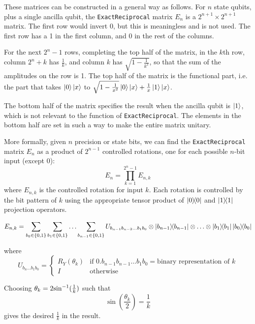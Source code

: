 \documentclass[12pt]{extarticle}
\begin{document}
These matrices can be constructed in a general way as follows.
For $n$ state qubits, plus a single ancilla qubit, the \texttt{ExactReciprocal} matrix $E_n$ is a $2^{n+1} \times 2^{n+1}$ matrix.
The first row would invert 0, but this is meaningless and is not used. The first row has a 1 in the first column, and 0 in the rest of the columns.

For the next $2^n-1$ rows, completing the top half of the matrix, in the $k$th row, column $2^n+k$ has $\frac{1}{k}$, and column $k$ has $\sqrt{1-\frac{1}{k^2}}$, so that the sum of the amplitudes on the row is 1.
The top half of the matrix is the functional part, i.e. the part that takes $\ket{0}\ket{x}$ to $\sqrt{1-\frac{1}{x^2}}\ket{0}\ket{x} + \frac{1}{x}\ket{1}\ket{x}$.

The bottom half of the matrix specifies the result when the ancilla qubit is $\ket{1}$, which is not relevant to the function of \texttt{ExactReciprocal}.
The elements in the bottom half are set in such a way to make the entire matrix unitary.

More formally, given $n$ precision or state bits, we can find the \texttt{ExactReciprocal} matrix $E_n$ as a product of $2^{n-1}$ controlled rotations, one for each possible $n$-bit input (except 0):
\[
E_n = \prod_{k=1}^{2^n-1} E_{n,k}
\]
where $E_{n,k}$ is the controlled rotation for input $k$.
Each rotation is controlled by the bit pattern of $k$ using the appropriate tensor product of $\outerproduct{0}$ and $\outerproduct{1}$ projection operators.

\begin{small}
\[
E_{n,k} =
\sum_{b_0\in\{0,1\}} \sum_{b_1\in\{0,1\}} \ldots \sum_{b_{n-1}\in\{0,1\}} U_{b_{n-1}b_{n-2}\ldots b_1b_0} \otimes \outerproduct{b_{n-1}} \otimes \ldots \otimes \outerproduct{b_1} \outerproduct{b_0}
\]
\end{small}

where
\[
U_{b_n\ldots b_1b_0} = \begin{cases}
    R_Y(\theta_k) & \text{if } 0.b_{n-1}b_{n-1}\ldots b_1b_0 = \text{binary representation of } k \\
    I & \text{otherwise}
\end{cases}
\]

Choosing $\theta_k = 2{{\sin}^{-1}}(\frac{1}{k})$ such that
\[
\sin\left(\frac{\theta_k}{2}\right) = \frac{1}{k}
\]
gives the desired $\frac{1}{k}$ in the result.
\end{document}
